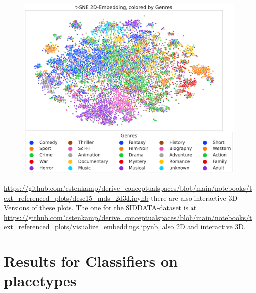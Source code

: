 \begin{figure}[h]
	\begin{center}
	  \includegraphics[width=\textwidth]{graphics/figures/scatter_mds_tsne_movies_Genres.pdf}
	  \label{fig:scatter_mds_movies}
	\end{center}
\end{figure}


 \url{https://github.com/cstenkamp/derive_conceptualspaces/blob/main/notebooks/text_referenced_plots/desc15_mds_2d3d.ipynb} there are also interactive 3D-Versions of these plots. The one for the SIDDATA-dataset is at \url{https://github.com/cstenkamp/derive_conceptualspaces/blob/main/notebooks/text_referenced_plots/visualize_embeddings.ipynb}, also 2D and interactive 3D. 

\clearpage
\section{Results for Classifiers on placetypes}

